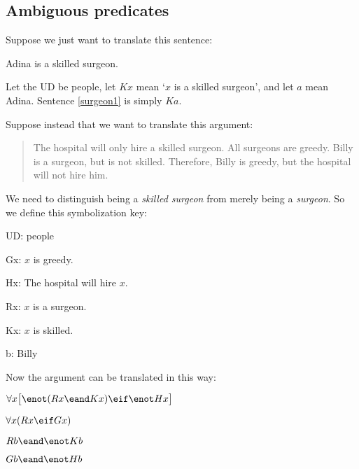 \subsection{Ambiguous predicates}

Suppose we just want to translate this sentence:
\begin{earg}
\item[\ex{surgeon1}] Adina is a skilled surgeon.
\end{earg}
Let the UD be people, let $Kx$ mean `$x$ is a skilled surgeon', and let $a$ mean Adina. Sentence \ref{surgeon1} is simply $Ka$.


Suppose instead that we want to translate this argument:
\begin{quote}
The hospital will only hire a skilled surgeon. All surgeons are greedy. Billy is a surgeon, but is not skilled. Therefore, Billy is greedy, but the hospital will not hire him.
\end{quote}
We need to distinguish being a \emph{skilled surgeon} from merely being a \emph{surgeon}. So we define this symbolization key:
\begin{ekey}
\item[UD:] people
\item[Gx:] $x$ is greedy.
\item[Hx:] The hospital will hire $x$.
\item[Rx:] $x$ is a surgeon.
\item[Kx:] $x$ is skilled.
\item[b:] Billy
\end{ekey}

Now the argument can be translated in this way:
\begin{earg}
\label{surgeon2}
\item[] $\forall x\bigl[\enot (Rx \eand Kx) \eif \enot Hx\bigr]$
\item[] $\forall x(Rx \eif Gx)$
\item[] $Rb \eand \enot Kb$
\item[\therefore] $Gb \eand \enot Hb$
\end{earg}

